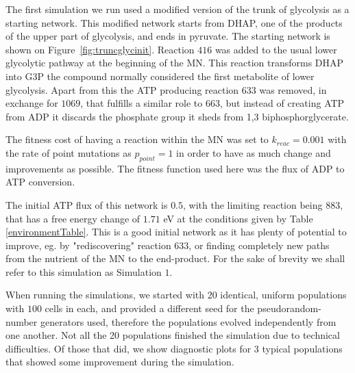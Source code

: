 \documentclass[a4paper,12pt]{article}
\begin{document}
The first simulation we run used a modified version of the trunk of glycolysis as a starting network. This modified network starts from DHAP, one of the products of the upper part of glycolysis, and ends in pyruvate. The starting network is shown on Figure~\ref{fig:truncglycinit}. Reaction $416$ was added to the usual lower glycolytic pathway at the beginning of the MN. This reaction transforms DHAP into G3P the compound normally considered the first metabolite of lower glycolysis. Apart from this the ATP producing reaction $633$ was removed, in exchange for $1069$, that fulfills a similar role to $663$, but instead of creating ATP from ADP it discards the phosphate group it sheds from 1,3 biphosphorglycerate.

The fitness cost of having a reaction within the MN was set to $k_{reac}=0.001$ with the rate of point mutations as $p_{point}=1$ in order to have as much change and improvements as possible. The fitness function used here was the flux of ADP to ATP conversion.

The initial ATP flux of this network is $0.5$, with the limiting reaction being $883$, that has a free energy change of $1.71$ eV at the conditions given by Table \ref{environmentTable}. This is a good initial network as it has plenty of potential to improve, eg. by "rediscovering" reaction $633$, or finding completely new paths from the nutrient of the MN to the end-product. For the sake of brevity we shall refer to this simulation as Simulation $1$.

When running the simulations, we started with 20 identical, uniform populations with $100$ cells in each, and provided a different seed for the pseudorandom-number generators used, therefore the populations evolved independently from one another. Not all the 20 populations finished the simulation due to technical difficulties. Of those that did, we show diagnostic plots for 3 typical populations that showed some improvement during the simulation.
\end{document}
